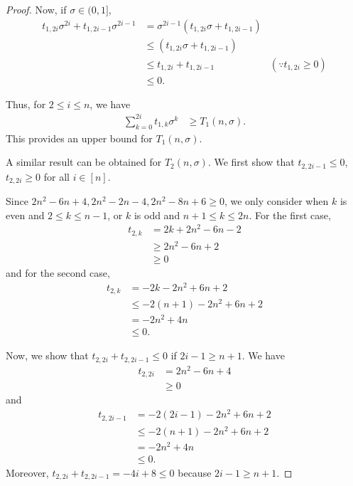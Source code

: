 \documentclass{article}
\theoremstyle{plain}
\theoremstyle{definition}
\theoremstyle{remark}
\begin{document}
\begin{proof}
Now, if $\sigma\in (0, 1]$, 
\begin{align*}
    t_{1,2i}\sigma^{2i}+t_{1,2i-1}\sigma^{2i-1} &= \sigma^{2i-1}(t_{1,2i}\sigma+t_{1,2i-1})\\
    &\le (t_{1,2i}\sigma+t_{1,2i-1})\\
    &\le t_{1,2i}+t_{1,2i-1} & (\because t_{1,2i}\ge 0)\\
    &\le 0.
\end{align*}

Thus, for $2\le i\le n$, we have 
\begin{align}
    \sum_{k=0}^{2i} t_{1,k}\sigma^k &\ge T_1(n, \sigma). \label{eq:t1ub}
\end{align}
This provides an upper bound for $T_1(n, \sigma)$. 

A similar result can be obtained for $T_2(n, \sigma)$. We first show that $t_{2,2i-1}\le 0$, $t_{2,2i}\ge 0$ for all $i\in [n]$.

Since $2n^2 - 6n + 4, 2n^2 - 2n - 4, 2n^2 -8n + 6\ge 0$, we only consider when $k$ is even and $2\le k \le n-1$, or $k$ is odd and $n+1 \le k \le 2n$. For the first case,
\begin{align*}
    t_{2,k} &= 2k + 2n^2 - 6n -2 \\
    &\ge 2n^2 - 6n + 2 \\
    &\ge 0
\end{align*}
and for the second case,
\begin{align*}
    t_{2,k} &= -2k - 2n^2 + 6n + 2 \\
    &\le -2(n+1) - 2n^2 + 6n + 2 \\
    &= -2n^2 + 4n \\
    &\le 0.
\end{align*}

Now, we show that $t_{2,2i} + t_{2,2i-1}\le 0$ if $2i-1\ge n+1$.
We have
\begin{align*}
    t_{2,2i} &= 2n^2 - 6n + 4 \\
    &\ge 0
\end{align*}
and
\begin{align*}
    t_{2,2i-1} &= -2(2i-1) - 2n^2 + 6n + 2\\
    &\le -2(n+1) - 2n^2 + 6n + 2\\
    &= -2n^2 + 4n \\
    &\le 0.
\end{align*}
Moreover, $t_{2,2i} + t_{2,2i-1} = -4i + 8\le 0$ because $2i-1 \ge n+1$.


\end{proof}
\end{document}

